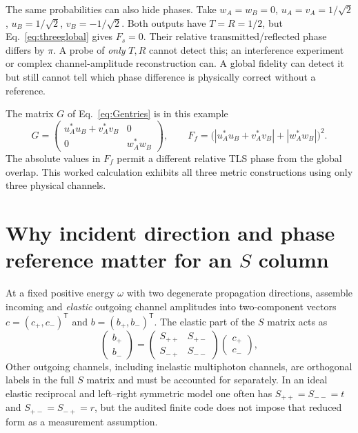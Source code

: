 \documentclass[11pt,a4paper]{article}
\begin{document}
The same probabilities can also hide phases. Take $w_A=w_B=0$, $u_A=v_A=1/\sqrt2$, $u_B=1/\sqrt2$, $v_B=-1/\sqrt2$. Both outputs have $T=R=1/2$, but Eq.~\eqref{eq:threeglobal} gives $F_s=0$. Their relative transmitted/reflected phase differs by $\pi$. A probe of \emph{only} $T,R$ cannot detect this; an interference experiment or complex channel-amplitude reconstruction can. A global fidelity can detect it but still cannot tell which phase difference is physically correct without a reference.

The matrix $G$ of Eq.~\eqref{eq:Gentries} is in this example
\begin{equation}
 G=\begin{pmatrix}
 u_A^*u_B+v_A^*v_B&0\\
 0&w_A^*w_B
 \end{pmatrix},\qquad
 F_f=\bigl(|u_A^*u_B+v_A^*v_B|+|w_A^*w_B|\bigr)^2.
 \label{eq:threeG}
\end{equation}
The absolute values in $F_f$ permit a different relative TLS phase from the global overlap. This worked calculation exhibits all three metric constructions using only three physical channels.

\section[Why incident direction and phase reference matter for an S column]{Why incident direction and phase reference matter for an $S$ column}
\label{app:direction}
At a fixed positive energy $\omega$ with two degenerate propagation directions, assemble incoming and \emph{elastic} outgoing channel amplitudes into two-component vectors $c=(c_+,c_-)^{\mathsf T}$ and $b=(b_+,b_-)^{\mathsf T}$. The elastic part of the $S$ matrix acts as
\begin{equation}
 \begin{pmatrix}b_+\\b_-\end{pmatrix}
 =\begin{pmatrix}S_{++}&S_{+-}\\S_{-+}&S_{--}\end{pmatrix}
 \begin{pmatrix}c_+\\c_-\end{pmatrix},
 \label{eq:Smatrix2}
\end{equation}
Other outgoing channels, including inelastic multiphoton channels, are orthogonal labels in the full $S$ matrix and must be accounted for separately. In an ideal elastic reciprocal and left--right symmetric model one often has $S_{++}=S_{--}=t$ and $S_{+-}=S_{-+}=r$, but the audited finite code does not impose that reduced form as a measurement assumption.
\end{document}
